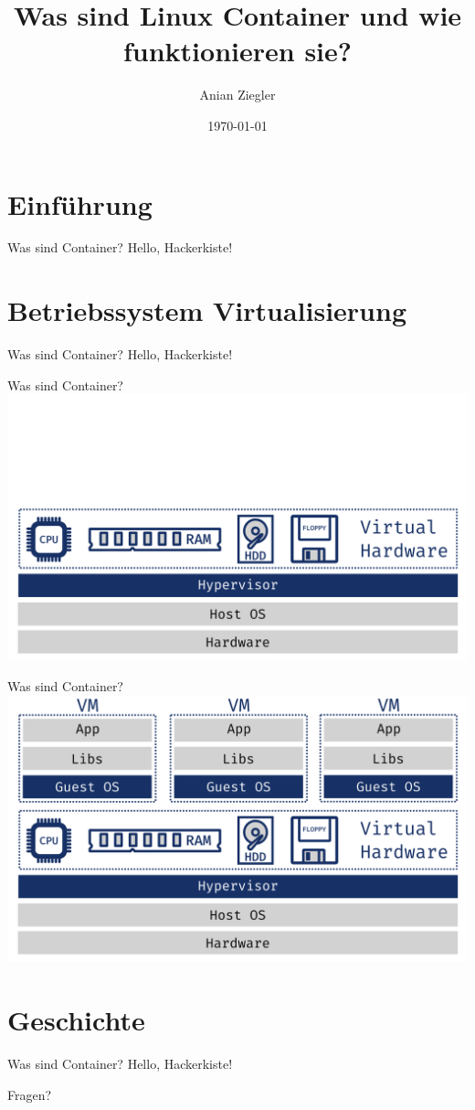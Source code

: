 \documentclass{beamer}
\title{Was sind Linux Container und wie funktionieren sie?}
\date{\today}
\author{Anian Ziegler}
\institute{cioplenu}
\begin{document}
  \maketitle
  \section{Einführung}
  \begin{frame}{Was sind Container?}
    Hello, Hackerkiste!
  \end{frame}

  \section{Betriebssystem Virtualisierung}
  \begin{frame}{Was sind Container?}
    Hello, Hackerkiste!
  \end{frame}
  \begin{frame}{Was sind Container?}
    \includegraphics[width=\textwidth]{hypervisor}
  \end{frame}
  \begin{frame}{Was sind Container?}
    \includegraphics[width=\textwidth]{vms}
  \end{frame}
  \section{Geschichte}
  \begin{frame}{Was sind Container?}
    Hello, Hackerkiste!
  \end{frame}
  \begin{frame}[standout]
    Fragen?
  \end{frame}
\end{document}

